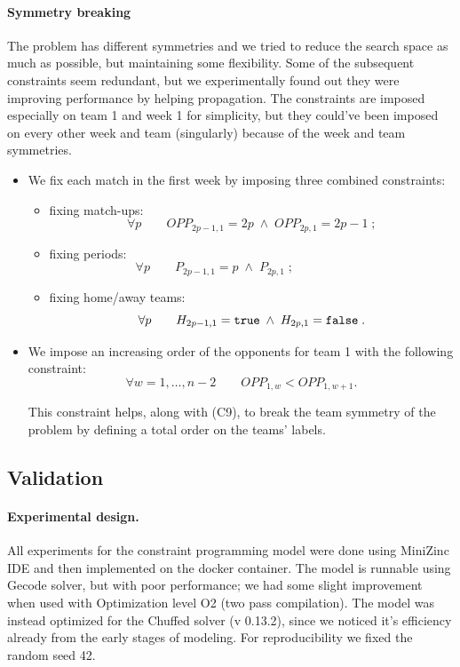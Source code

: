 \paragraph{Symmetry breaking}
The problem has different symmetries and we tried to reduce the search space as much as possible, but maintaining some flexibility. Some of the subsequent constraints seem redundant, but we experimentally found out they were improving performance by helping propagation.
The constraints are imposed especially on team 1 and week 1 for simplicity, but they could've been imposed on every other week and team (singularly) because of the week and team symmetries.
\begin{itemize}
    \item [(C9)] We fix each match in the first week by imposing three combined constraints:
    \begin{itemize}
        \item fixing match-ups:
            \[
            \forall p \qquad OPP_{2p-1, 1} = 2p \; \land \;OPP_{2p, 1} = 2p-1\;;
            \]
        \item fixing periods:
            \[
            \forall p \qquad P_{2p-1, 1} =  p \; \land \; P_{2p, 1}\;;\qquad\qquad\qquad
            \]
        \item fixing home/away teams:
            \[
            \forall p \qquad H_{2p-1, 1} =  \verb|true| \; \land \; H_{2p, 1} = \verb|false|\;.
            \]
    \end{itemize}

    \item [(C10)] We impose an increasing order of the opponents for team 1 with the following constraint:
    \[
    \forall w = 1,\dots, n-2\qquad OPP_{1,w} < OPP_{1, w+1}.
    \]

    This constraint helps, along with (C9), to break the team symmetry of the problem by defining a total order on the teams' labels.
    
\end{itemize}


\subsection{Validation}



\paragraph{Experimental design.}
All experiments for the constraint programming model were done using MiniZinc IDE and then implemented on the docker container. The model is runnable using Gecode solver, but with poor performance; we had some slight improvement when used with Optimization level O2 (two pass compilation).
The model was instead optimized for the Chuffed solver (v 0.13.2), since we noticed it's efficiency already from the early stages of modeling.
For reproducibility we fixed the random seed 42.

